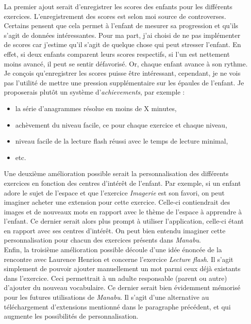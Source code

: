 La premier ajout serait d'enregistrer les scores des enfants pour les différents exercices. L'enregistrement des scores est selon moi source de controverses. Certains pensent que cela permet à l'enfant de mesurer sa progression et qu'ils s'agit de données intéressantes. Pour ma part, j'ai choisi de ne pas implémenter de scores car j'estime qu'il s'agit de quelque chose qui peut stresser l'enfant. En effet, si deux enfants comparent leurs scores respectifs, si l'un est nettement moins avancé, il peut se sentir défavorisé. Or, chaque enfant avance à son rythme. Je conçois qu'enregistrer les scores puisse être intéressant, cependant, je ne vois pas l'utilité de mettre une pression supplémentaire sur les épaules de l'enfant. Je proposerais plutôt un système d'\textit{achievements}, par exemple :
\begin{itemize}
\item la série d'anagrammes résolue en moins de X minutes,
\item achèvement du niveau facile, ce pour chaque exercice et chaque niveau,
\item niveau facile de la lecture flash réussi avec le temps de lecture minimal,
\item etc.
\end{itemize}

Une deuxième amélioration possible serait la personnalisation des différents exercices en fonction des centres d'intérêt de l'enfant. Par exemple, si un enfant adore le sujet de l'espace et que l'exercice \textit{Imagerie} est son favori, on peut imaginer acheter une extension pour cette exercice. Celle-ci contiendrait des images et de nouveaux mots en rapport avec le thème de l'espace à apprendre à l'enfant. Ce dernier serait alors plus prompt à utiliser l'application, celle-ci étant en rapport avec ses centres d'intérêt. On peut bien entendu imaginer cette personnalisation pour chacun des exercices présents dans \textit{Manabu}.\\


Enfin, la troisième amélioration possible découle d'une idée énoncée de la rencontre avec Laurence Henrion et concerne l'exercice \textit{Lecture flash}. Il s'agit simplement de pouvoir ajouter manuellement un mot parmi ceux déjà existants dans l'exercice. Ceci permettrait à un adulte responsable (parent ou autre) d'ajouter du nouveau vocabulaire. Ce dernier serait bien évidemment mémorisé pour les futures utilisations de \textit{Manabu}. Il s'agit d'une alternative au téléchargement d'extensions mentionné dans le paragraphe précédent, et qui augmente les possibilités de personnalisation.
